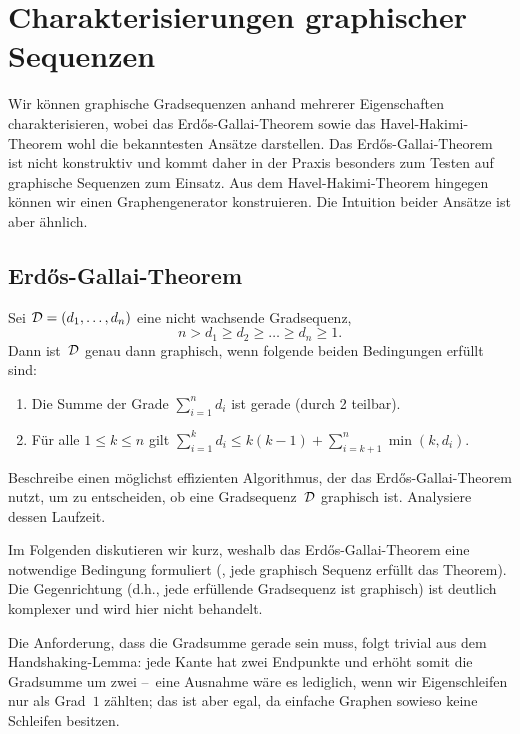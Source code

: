 \section{Charakterisierungen graphischer Sequenzen}
Wir können graphische Gradsequenzen anhand mehrerer Eigenschaften charakterisieren, wobei das Erd\H{o}s-Gallai-Theorem sowie das Havel-Hakimi-Theorem wohl die bekanntesten Ansätze darstellen.
Das Erd\H{o}s-Gallai-Theorem ist nicht konstruktiv und kommt daher in der Praxis besonders zum Testen auf graphische Sequenzen zum Einsatz.
Aus dem Havel-Hakimi-Theorem hingegen können wir einen Graphengenerator konstruieren.
Die Intuition beider Ansätze ist aber ähnlich.

\subsection{Erd\H{o}s-Gallai-Theorem}
\begin{theorem}
    Sei $\mathcal{D} = (d_1, \ldots, d_n)$ eine nicht wachsende Gradsequenz, \dh
    \begin{equation}
        n > d_1 \ge d_2 \ge \ldots \ge d_n \ge 1.
    \end{equation}
    Dann ist~$\mathcal{D}$ genau dann graphisch, wenn folgende beiden Bedingungen erfüllt sind:
    \begin{enumerate}
        \item Die Summe der Grade $\sum_{i=1}^n d_i$ ist gerade (durch 2 teilbar).
        \item Für alle $1 \le k \le n$ gilt $\sum_{i=1}^k d_i \le k(k-1) + \sum_{i=k+1}^n \min(k, d_i)$. \qedhere
    \end{enumerate}
\end{theorem}

\begin{exercise}
    Beschreibe einen möglichst effizienten Algorithmus, der das Erd\H{o}s-Gallai-Theorem nutzt, um zu entscheiden, ob eine Gradsequenz~$\mathcal{D}$ graphisch ist.
    Analysiere dessen Laufzeit.
\end{exercise}

Im Folgenden diskutieren wir kurz, weshalb das Erd\H{o}s-Gallai-Theorem eine notwendige Bedingung formuliert (\dh, jede graphisch Sequenz erfüllt das Theorem).
Die Gegenrichtung (d.h., jede erfüllende Gradsequenz ist graphisch) ist deutlich komplexer und wird hier nicht behandelt.

Die Anforderung, dass die Gradsumme gerade sein muss, folgt trivial aus dem Handshaking-Lemma:
jede Kante hat zwei Endpunkte und erhöht somit die Gradsumme um zwei
--~eine Ausnahme wäre es lediglich, wenn wir Eigenschleifen nur als Grad~$1$ zählten; das ist aber egal, da einfache Graphen sowieso keine Schleifen besitzen.

